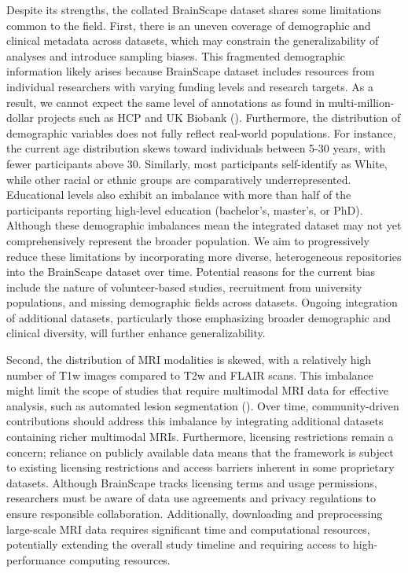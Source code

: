 Despite its strengths, the collated BrainScape dataset shares some limitations common to the field. 
First, there is an uneven coverage of demographic and clinical metadata across datasets, 
which may constrain the generalizability of analyses and introduce sampling biases. 
This fragmented demographic information likely arises because BrainScape dataset includes resources from individual researchers 
with varying funding levels and research targets. 
As a result, we cannot expect the same level of annotations as found in multi-million-dollar projects 
such as HCP and UK Biobank (\cite{van2013wu, miller2016multimodal}).
Furthermore, the distribution of demographic variables does not fully reflect real-world populations. 
For instance, the current age distribution skews toward individuals between 5-30 years, with fewer participants above 30.
Similarly, most participants self-identify as White, while other racial or ethnic groups are comparatively underrepresented. 
Educational levels also exhibit an imbalance with more than half of the participants reporting high-level education (bachelor's, master's, or PhD).
Although these demographic imbalances mean the integrated dataset may not yet comprehensively represent 
the broader population. We aim to progressively reduce 
these limitations by incorporating more diverse, heterogeneous repositories into the BrainScape dataset over time.
Potential reasons for the current bias include the nature of volunteer-based studies, 
recruitment from university populations, and missing demographic fields across datasets. 
Ongoing integration of additional datasets, particularly those emphasizing broader demographic 
and clinical diversity, will further enhance generalizability. 


Second, the distribution of MRI modalities is skewed, with a relatively high number of T1w images compared to T2w and FLAIR scans. 
This imbalance might limit the scope of studies that require multimodal MRI data for effective analysis, such as automated lesion segmentation (\cite{menze2014multimodal, spitzer2022interpretable}). 
Over time, community-driven contributions should address this imbalance by integrating additional datasets containing richer multimodal MRIs. 
Furthermore, licensing restrictions remain a concern; reliance on publicly available data means that the framework is subject to existing licensing restrictions 
and access barriers inherent in some proprietary datasets.
Although BrainScape tracks licensing terms and usage permissions, researchers must be aware of 
data use agreements and privacy regulations to ensure responsible collaboration. 
Additionally, downloading and preprocessing large-scale MRI data requires significant time and computational resources, 
potentially extending the overall study timeline and requiring access to high-performance computing resources.

